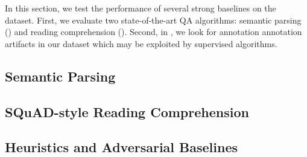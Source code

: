 In this section, we test the performance of several strong baselines on the
\drop~ dataset.
First, we evaluate two state-of-the-art QA algorithms:
semantic parsing () and reading comprehension ().
Second, in , we look for annotation annotation artifacts in our dataset which may be exploited by supervised algorithms. 

\subsection{Semantic Parsing}
\label{sec:semparse}


\subsection{SQuAD-style Reading Comprehension}
\label{sec:rc}


\subsection{Heuristics and Adversarial Baselines}
\label{sec:heuristics}

